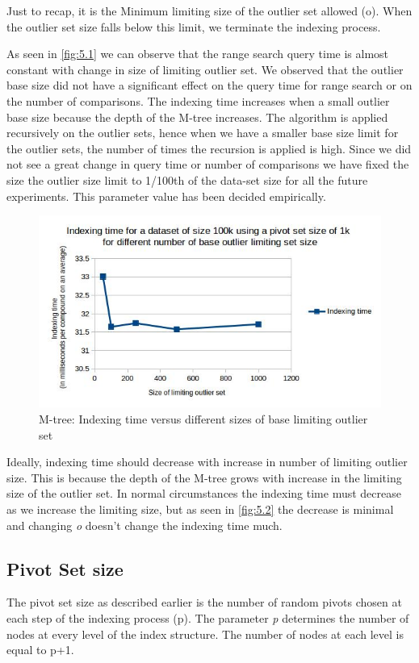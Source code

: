 Just to recap, it is the Minimum limiting size of the outlier set allowed (o). When the outlier set size falls below this limit, we terminate the indexing process.

As seen in \ref{fig:5.1} we can observe that the range search query time is almost constant with change in size of limiting outlier set. We observed that the outlier base size did not have a significant effect on the query time for range search or on the number of comparisons. The indexing time increases when a small outlier base size because the depth of the M-tree increases. The algorithm is applied recursively on the outlier sets, hence when we have a smaller base size limit for the outlier sets, the number of times the recursion is applied is high. Since we did not see a great change in query time or number of comparisons we have fixed the size the outlier size limit to 1/100th of the data-set size for all the future experiments. This parameter value has been decided empirically.


\begin{figure}[ht!]	
\centering
\includegraphics[width=1 \columnwidth]{img/image8.jpg}
\caption{M-tree: Indexing time versus different sizes of base limiting outlier set}
\label{fig:5.2}
\end{figure}


Ideally, indexing time should decrease with increase in number of limiting outlier size. This is because the depth of the M-tree grows with increase in the limiting size of the outlier set. In normal circumstances the indexing time must decrease as we increase the limiting size, but as seen in \autoref{fig:5.2} the decrease is minimal and changing \textit{o} doesn't change the indexing time much. \\


\subsection{Pivot Set size}
The pivot set size as described earlier is the number of random pivots chosen at each step of the indexing process (p). The parameter \textit{p} determines the number of nodes at every level of the index structure. The number of nodes at each level is equal to p+1.

